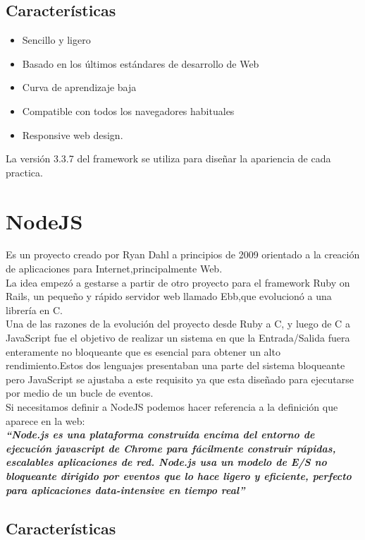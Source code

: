 \subsection*{Características}
\begin{itemize}
\item Sencillo y ligero
\item Basado en los últimos estándares de desarrollo de Web
\item Curva de aprendizaje baja
\item Compatible con todos los navegadores habituales
\item Responsive web design.
\end{itemize}
La versión 3.3.7 del framework se utiliza para diseñar la apariencia de cada practica.
\section{NodeJS}
Es un proyecto creado por Ryan Dahl a principios de 2009  orientado a la creación de aplicaciones para Internet,principalmente Web.
\\La idea empezó a gestarse a partir de otro proyecto para el framework Ruby on Rails, un pequeño y rápido servidor web llamado Ebb,que evolucionó a una librería en C.
\\Una de las razones de la evolución del proyecto desde Ruby a C, y luego de C a JavaScript fue el objetivo de realizar un sistema en que la Entrada/Salida fuera enteramente no bloqueante que es esencial para obtener un alto rendimiento.Estos dos lenguajes presentaban una parte del sistema bloqueante pero JavaScript se ajustaba a este requisito ya que esta diseñado para ejecutarse por medio de un bucle de eventos.
\\Si necesitamos definir a NodeJS\cite{nodejs} podemos hacer referencia a la definición que aparece en la web:\\
\textbf{\textit{“Node.js es una plataforma construida encima del entorno de ejecución javascript
de Chrome para fácilmente construir rápidas, escalables aplicaciones de red.
Node.js usa un modelo de E/S no bloqueante dirigido por eventos que lo hace ligero
y eficiente, perfecto para aplicaciones data-intensive en tiempo real”}}
\subsection{Características}

